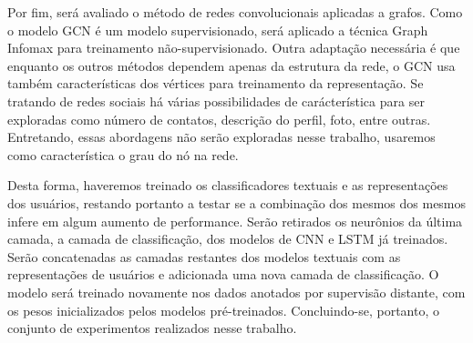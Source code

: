 Por fim, será avaliado o método de redes convolucionais aplicadas a grafos.
Como o modelo GCN é um modelo supervisionado, será aplicado a técnica Graph
Infomax para treinamento não-supervisionado.
Outra adaptação necessária é que enquanto os outros métodos dependem apenas da
estrutura da rede, o GCN usa também características dos vértices para
treinamento da representação.
Se tratando de redes sociais há várias possibilidades de carácterística para ser
exploradas como número de contatos, descrição do perfil, foto, entre outras.
Entretando, essas abordagens não serão exploradas nesse trabalho, usaremos como
característica o grau do nó na rede.

Desta forma, haveremos treinado os classificadores textuais e as representações
dos usuários, restando portanto a testar se a combinação dos mesmos dos mesmos
infere em algum aumento de performance.
Serão retirados os neurônios da última camada, a camada de classificação, dos
modelos de CNN e LSTM já treinados.
Serão concatenadas as camadas restantes dos modelos textuais com as
representações de usuários e adicionada uma nova camada de classificação.
O modelo será treinado novamente nos dados anotados por supervisão distante, com
os pesos inicializados pelos modelos pré-treinados.
Concluindo-se, portanto, o conjunto de experimentos realizados nesse trabalho.
